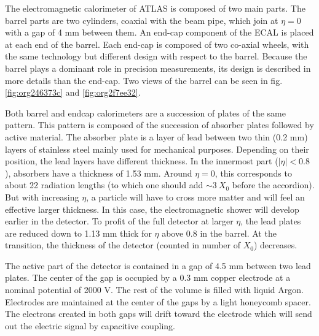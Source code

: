 The electromagnetic calorimeter of ATLAS is composed of two main parts.
The barrel parts are two cylinders, coaxial with the beam pipe, which join at $\eta=0$ with a gap of 4 mm between them.
An end-cap component of the ECAL is placed at each end of the barrel.
Each end-cap is composed of two co-axial wheels, with the same technology but different design with respect to the barrel.
Because the barrel plays a dominant role in precision measurements, its design is described in more details than the end-cap.
Two views of the barrel can be seen in fig. \ref{fig:org246373c} and \ref{fig:org2f7ee32}.



Both barrel and endcap calorimeters are a succession of plates of the same pattern.
This pattern is composed of the succession of absorber plates followed by active material.
The absorber plate is a layer of lead between two thin (0.2 mm) layers of stainless steel mainly used for mechanical purposes.
Depending on their position, the lead layers have different thickness.
In the innermost part ($|\eta|<0.8$), absorbers have a thickness of 1.53 mm.
Around $\eta=0$, this corresponds to about 22 radiation lengths (to which one should add $\sim 3\ X_0$ before the accordion).
But with increasing $\eta$, a particle will have to cross more matter and will feel an effective larger thickness.
In this case, the electromagnetic shower will develop earlier in the detector.
To profit of the full detector at larger $\eta$, the lead plates are reduced down to 1.13 mm thick for $\eta$ above 0.8 in the barrel.
At the transition, the thickness of the detector (counted in number of $X_0$) decreases.

The active part of the detector is contained in a gap of 4.5 mm between two lead plates.
The center of the gap is occupied by a 0.3 mm copper electrode at a nominal potential of 2000 V.
The rest of the volume is filled with liquid Argon.
Electrodes are maintained at the center of the gaps by a light honeycomb spacer.
The electrons created in both gaps will drift toward the electrode which will send out the electric signal by capacitive coupling.

